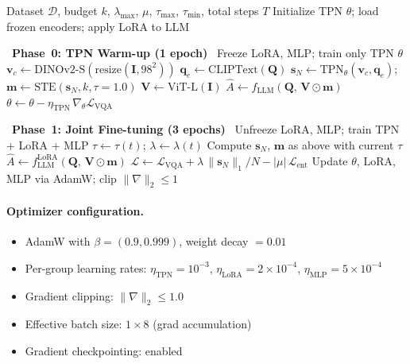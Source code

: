 \documentclass[11pt,a4paper]{article}
\newcommand{\vc}{\mathbf{v}_c}
\newcommand{\qe}{\mathbf{q}_e}
\newcommand{\vm}{\mathbf{m}}
\newcommand{\vs}{\mathbf{s}}
\newcommand{\mI}{\mathbf{I}}
\newcommand{\mQ}{\mathbf{Q}}
\newcommand{\mV}{\mathbf{V}}
\begin{document}
\begin{algorithm}[t]
\caption{TC-ViTok Two-Phase Training}
\label{alg:training}
\begin{algorithmic}[1]
\Require Dataset $\mathcal{D}$, budget $k$, $\lambda_{\max}$, $\mu$,
  $\tau_{\max}$, $\tau_{\min}$, total steps $T$
\State Initialize TPN $\theta$; load frozen encoders; apply LoRA to LLM

\Statex \hrulefill\ \textbf{Phase~0: TPN Warm-up (1 epoch)}\ \hrulefill
\State Freeze LoRA, MLP; train only TPN $\theta$
\For{each $(\mI, \mQ, A)$ in $\mathcal{D}$}
  \State $\vc \gets \text{DINOv2-S}(\text{resize}(\mI, 98^2))$
  \State $\qe \gets \text{CLIPText}(\mQ)$
  \State $\vs_N \gets \text{TPN}_\theta(\vc, \qe)$;\;
    $\vm \gets \text{STE}(\vs_N, k, \tau{=}1.0)$
  \State $\mV \gets \text{ViT-L}(\mI)$
  \State $\hat{A} \gets f_{\text{LLM}}(\mQ,\, \mV \odot \vm)$
  \State $\theta \gets \theta - \eta_{\text{TPN}}\,
    \nabla_\theta \mathcal{L}_{\text{VQA}}$
\EndFor

\Statex \hrulefill\ \textbf{Phase~1: Joint Fine-tuning (3 epochs)}\ \hrulefill
\State Unfreeze LoRA, MLP; train TPN + LoRA + MLP
  \State $\tau \gets \tau(t)$; $\lambda \gets \lambda(t)$
  \State Compute $\vs_N$, $\vm$ as above with current $\tau$
  \State $\hat{A} \gets f_{\text{LLM}}^{\text{LoRA}}(\mQ,\, \mV \odot \vm)$
  \State $\mathcal{L} \gets \mathcal{L}_{\text{VQA}}
    + \lambda\,\|\vs_N\|_1/N - |\mu|\,\mathcal{L}_{\text{ent}}$
  \State Update $\theta$, LoRA, MLP via AdamW;
    clip $\|\nabla\|_2 \leq 1$
\EndFor
\end{algorithmic}
\end{algorithm}

\paragraph{Optimizer configuration.}
\begin{itemize}[leftmargin=1.5em, itemsep=1pt]
  \item AdamW with $\beta = (0.9, 0.999)$, weight decay $= 0.01$
  \item Per-group learning rates:
    $\eta_{\text{TPN}} = 10^{-3}$,
    $\eta_{\text{LoRA}} = 2 \times 10^{-4}$,
    $\eta_{\text{MLP}} = 5 \times 10^{-4}$
  \item Gradient clipping: $\|\nabla\|_2 \leq 1.0$
  \item Effective batch size: $1 \times 8$ (grad accumulation)
  \item Gradient checkpointing: enabled
\end{itemize}
\end{document}
